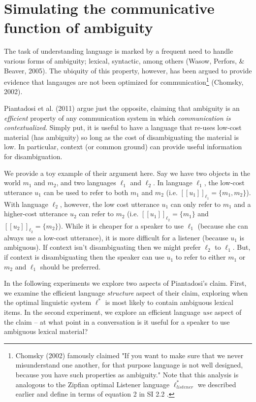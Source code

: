 \documentclass[10pt, letterpaper]{article}
\begin{document}
\section{Simulating the communicative function of
ambiguity}\label{simulating-the-communicative-function-of-ambiguity}

The task of understanding language is marked by a frequent need to
handle various forms of ambiguity; lexical, syntactic, among others
(Wasow, Perfors, \& Beaver, 2005). The ubiquity of this property,
however, has been argued to provide evidence that langauges are not been
optimized for
communication\footnote{Chomsky (2002) famously claimed "If you want to make sure that we never misunderstand one another, for that purpose language is not well designed, because you have such properties as ambiguity." Note that this analysis is analogous to the Zipfian optimal Listener language $\ell_{listener}^*$ we described earlier and define in terms of equation 2 in SI 2.2 .}
(Chomsky, 2002).

Piantadosi et al. (2011) argue just the opposite, claiming that
ambiguity is an \emph{efficient} property of any communication system in
which \emph{communication is contextualized}. Simply put, it is useful
to have a language that re-uses low-cost material (has ambiguity) so
long as the cost of disambiguating the material is low. In particular,
context (or common ground) can provide useful information for
disambiguation.\par

We provide a toy example of their argument here. Say we have two objects
in the world \(m_1\) and \(m_2\), and two languages \(\ell_1\) and
\(\ell_2\). In language \(\ell_1\), the low-cost utterance \(u_1\) can
be used to refer to both \(m_1\) and \(m_2\) (i.e.
\([[u_1]]_{\ell_1} = \{m_1, m_2 \}\)). With language \(\ell_2\),
however, the low cost utterance \(u_1\) can only refer to \(m_1\) and a
higher-cost utterance \(u_2\) can refer to \(m_2\) (i.e.
\([[u_1]]_{\ell_2} = \{m_1\}\) and \([[u_2]]_{\ell_2} = \{m_2 \}\)).
While it is cheaper for a speaker to use \(\ell_1\) (because she can
always use a low-cost utterance), it is more difficult for a listener
(because \(u_1\) is ambiguous). If context isn't disambiguating then we
might prefer \(\ell_2\) to \(\ell_1\). But, if context is disambiguating
then the speaker can use \(u_1\) to refer to either \(m_1\) or \(m_2\)
and \(\ell_1\) should be preferred.\par

In the following experiments we explore two aspects of Piantadosi's
claim. First, we examine the efficient language \emph{structure} aspect
of their claim, exploring when the optimal linguistic system \(\ell^*\)
is most likely to contain ambiguous lexical items. In the second
experiment, we explore an efficient language \emph{use} aspect of the
claim -- at what point in a conversation is it useful for a speaker to
use ambiguous lexical material?\par
\end{document}
